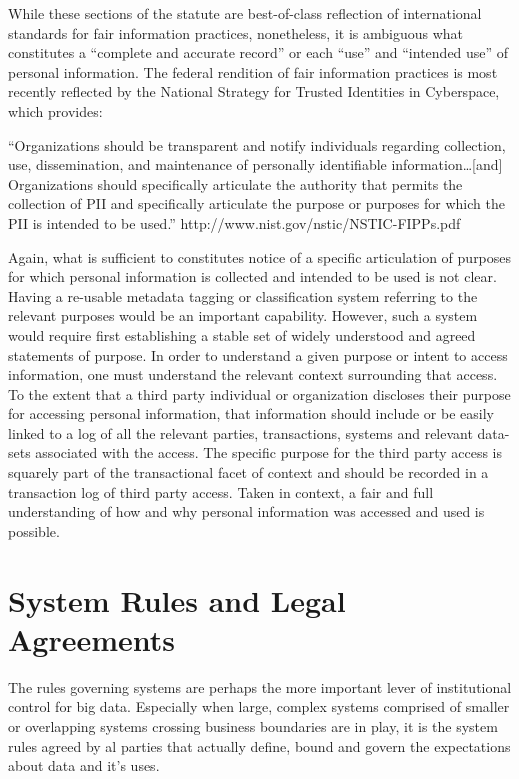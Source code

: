 While these sections of the statute are best-of-class reflection of international standards for fair information practices, nonetheless, it is ambiguous what constitutes a “complete and accurate record” or each “use” and “intended use” of personal information. The federal rendition of fair information practices is most recently reflected by the National Strategy for Trusted Identities in Cyberspace, which provides:

“Organizations should be transparent and notify individuals regarding collection, use, dissemination, and maintenance of personally identifiable information…[and] Organizations should specifically articulate the authority that permits the collection of PII and specifically articulate the purpose or purposes for which the PII is intended to be used.” http://www.nist.gov/nstic/NSTIC-FIPPs.pdf

Again, what is sufficient to constitutes notice of a specific articulation of purposes for which personal information is collected and intended to be used is not clear. Having a re-usable metadata tagging or classification system referring to the relevant purposes would be an important capability. However, such a system would require first establishing a stable set of widely understood and agreed statements of purpose. In order to understand a given purpose or intent to access information, one must understand the relevant context surrounding that access.
To the extent that a third party individual or organization discloses their purpose for accessing personal information, that information should include or be easily linked to a log of all the relevant parties, transactions, systems and relevant data-sets associated with the access. The specific purpose for the third party access is squarely part of the transactional facet of context and should be recorded in a transaction log of third party access. Taken in context, a fair and full understanding of how and why personal information was accessed and used is possible.

\section{System Rules and Legal Agreements}

The rules governing systems are perhaps the more important lever of institutional control for big data. Especially when large, complex systems comprised of smaller or overlapping systems crossing business boundaries are in play, it is the system rules agreed by al parties that actually define, bound and govern the expectations about data and it’s uses.


